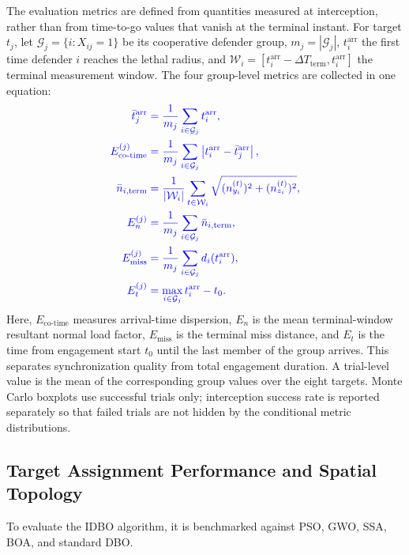 \documentclass[lettersize,journal]{IEEEtran}
\providecommand{\DIFadd}[1]{{\protect\color{blue}#1}} %
\providecommand{\DIFaddend}{} %
\DeclareRobustCommand{\DIFaddend}{\DIFOaddend \let\includegraphics\DIFOincludegraphics} %
\begin{document}
\DIFadd{The evaluation metrics are defined from quantities measured at interception, rather than from
time-to-go values that vanish at the terminal instant. For target $t_j$, let
$\mathcal G_j=\{i:X_{ij}=1\}$ be its cooperative defender group,
$m_j=|\mathcal G_j|$, $t_i^{\mathrm{arr}}$ the first time defender $i$ reaches the lethal
radius, and $\mathcal W_i=[t_i^{\mathrm{arr}}-\Delta T_{\mathrm{term}},
t_i^{\mathrm{arr}}]$ the terminal measurement window. The four group-level metrics are
collected in one equation:
}\begin{equation}
\DIFadd{\label{eq:evaluation_metrics}
\begin{aligned}
\bar t_j^{\mathrm{arr}}
 &=\frac{1}{m_j}\sum_{i\in\mathcal G_j}t_i^{\mathrm{arr}},\\
E_{\mathrm{co\text{-}time}}^{(j)}
 &=\frac{1}{m_j}\sum_{i\in\mathcal G_j}
 \left|t_i^{\mathrm{arr}}-\bar t_j^{\mathrm{arr}}\right|,\\
\bar n_{i,\mathrm{term}}
 &=\frac{1}{|\mathcal W_i|}\sum_{t\in\mathcal W_i}
 \sqrt{(n_{y_i}^{(t)})^2+(n_{z_i}^{(t)})^2},\\
E_n^{(j)}
 &=\frac{1}{m_j}\sum_{i\in\mathcal G_j}
 \bar n_{i,\mathrm{term}},\\
E_{\mathrm{miss}}^{(j)}
 &=\frac{1}{m_j}\sum_{i\in\mathcal G_j}d_i(t_i^{\mathrm{arr}}),\\
E_t^{(j)}&=\max_{i\in\mathcal G_j}t_i^{\mathrm{arr}}-t_0.
\end{aligned}
}\end{equation}
\DIFadd{Here, $E_{\mathrm{co\text{-}time}}$ measures arrival-time dispersion,
$E_n$ is the mean terminal-window resultant normal load factor, $E_{\mathrm{miss}}$ is the terminal miss
distance, and $E_t$ is the time from engagement start $t_0$ until the last member of the group
arrives. This separates synchronization quality from total engagement duration. A trial-level
value is the mean of the corresponding group values over the eight targets. Monte Carlo
boxplots use successful trials only; interception success rate is reported separately so that
failed trials are not hidden by the conditional metric distributions.
 }

\DIFaddend \subsection{Target Assignment Performance and Spatial Topology}
\label{subsec:assignment_results}

To evaluate the IDBO algorithm, it is benchmarked against PSO, GWO, SSA, BOA, and standard DBO. 
\end{document}
